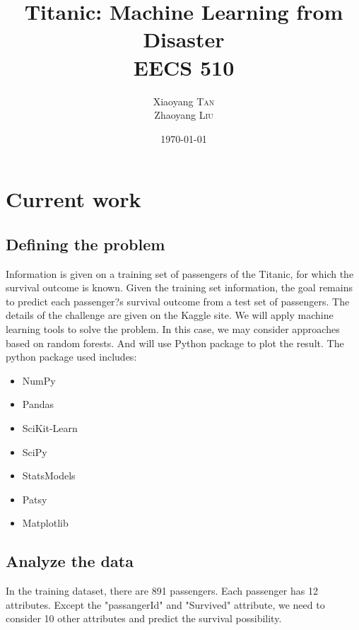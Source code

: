 \documentclass{article}
\title{Titanic: Machine Learning from Disaster \\ EECS 510} %
\author{Xiaoyang \textsc{Tan} \\ Zhaoyang \textsc{Liu} } %
\date{\today} %
\begin{document}
\maketitle


\section{Current work}

\subsection{Defining the problem}

\label{definitions}
	Information is given on a training set of passengers of the Titanic, for which the survival outcome is known. Given the training set information, the goal remains to predict each passenger?s survival outcome from a test set of passengers. The details of the challenge are given on the Kaggle site.
\newline
\newline
We will apply machine learning tools to solve the problem. In this case, we may consider approaches based on random forests. And will use Python package to plot the result. The python package used includes:

\begin{itemize}
	\item NumPy
	\item Pandas
	\item SciKit-Learn
	\item SciPy
	\item StatsModels
	\item Patsy
	\item Matplotlib
\end{itemize}
 


\subsection{Analyze the data}
In the training dataset, there are 891 passengers. Each passenger has 12 attributes. Except the "passangerId" and "Survived" attribute, we need to consider 10 other attributes 
and predict the survival possibility.
\end{document}
